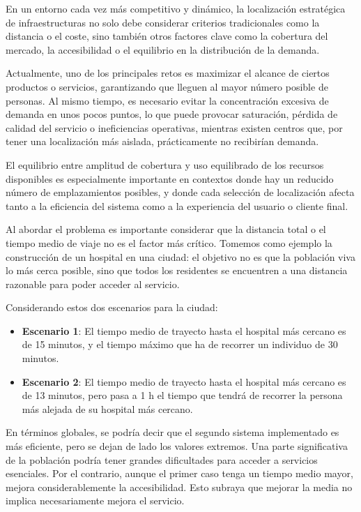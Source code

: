 \documentclass[12pt,a4paper]{book}
\begin{document}
En un entorno cada vez más competitivo y dinámico, la localización estratégica de infraestructuras no solo debe considerar criterios tradicionales como la distancia o el coste, sino también otros factores clave como la cobertura del mercado, la accesibilidad o el equilibrio en la distribución de la demanda.

Actualmente, uno de los principales retos es maximizar el alcance de ciertos productos o servicios, garantizando que lleguen al mayor número posible de personas. Al mismo tiempo, es necesario evitar la concentración excesiva de demanda en unos pocos puntos, lo que puede provocar saturación, pérdida de calidad del servicio o ineficiencias operativas, mientras existen centros que, por tener una localización más aislada, prácticamente no recibirían demanda.

El equilibrio entre amplitud de cobertura y uso equilibrado de los recursos disponibles es especialmente importante en contextos donde hay un reducido número de emplazamientos posibles, y donde cada selección de localización afecta tanto a la eficiencia del sistema como a la experiencia del usuario o cliente final.

Al abordar el problema es importante considerar que la distancia total o el tiempo medio de viaje no es el factor más crítico. 
Tomemos como ejemplo la construcción de un hospital en una ciudad: el objetivo no es que la población viva lo más cerca posible, sino que todos los residentes se encuentren a una distancia razonable para poder acceder al servicio.

Considerando estos dos escenarios para la ciudad:

\begin{itemize}
    \item \textbf{Escenario 1}: El tiempo medio de trayecto hasta el hospital más cercano es de 15 minutos, y el tiempo máximo que ha de recorrer un individuo de 30 minutos.
    \item \textbf{Escenario 2}: El tiempo medio de trayecto hasta el hospital más cercano es de 13 minutos, pero pasa a 1 h el tiempo que tendrá de recorrer la persona más alejada de su hospital más cercano.
\end{itemize} 

En términos globales, se podría decir que el segundo sistema implementado es más eficiente, pero se dejan de lado los valores extremos.
Una parte significativa de la población podría tener grandes dificultades para acceder a servicios esenciales.
Por el contrario, aunque el primer caso tenga un tiempo medio mayor, mejora considerablemente la accesibilidad. Esto subraya que mejorar la media no implica necesariamente mejora el servicio.
\newpage
\end{document}
